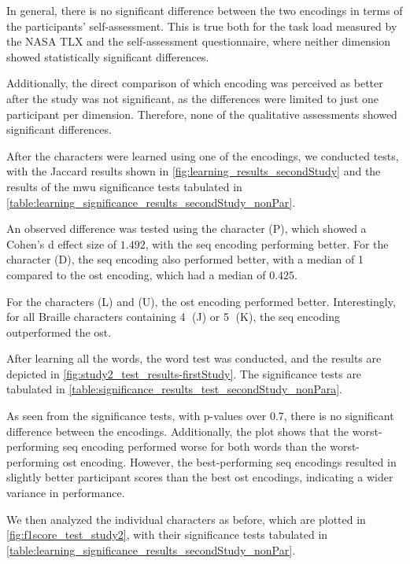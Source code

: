 In general, there is no significant difference between the two encodings in terms of the participants' self-assessment. This is true both for the task load measured by the NASA TLX and the self-assessment questionnaire, where neither dimension showed statistically significant differences.

Additionally, the direct comparison of which encoding was perceived as better after the study was not significant, as the differences were limited to just one participant per dimension. Therefore, none of the qualitative assessments showed significant differences.


After the characters were learned using one of the encodings, we conducted tests, with the Jaccard results shown in \autoref{fig:learning_results_secondStudy} and the results of the \gls{mwu} significance tests tabulated in \autoref{table:learning_significance_results_secondStudy_nonPar}.

An observed difference was tested using the character (P), which showed a Cohen's d effect size of $1.492$, with the \gls{seq} encoding performing better. For the character (D), the \gls{seq} encoding also performed better, with a median of 1 compared to the \gls{ost} encoding, which had a median of $0.425$.

For the characters (L) and (U), the \gls{ost} encoding performed better. Interestingly, for all Braille characters containing \textcircled{4} (J) or \textcircled{5} (K), the \gls{seq} encoding outperformed the \gls{ost}.


After learning all the words, the word test was conducted, and the results are depicted in \autoref{fig:study2_test_results-firstStudy}. The significance tests are tabulated in \autoref{table:significance_results_test_secondStudy_nonPara}.

As seen from the significance tests, with p-values over 0.7, there is no significant difference between the encodings. Additionally, the plot shows that the worst-performing \gls{seq} encoding performed worse for both words than the worst-performing \gls{ost} encoding. However, the best-performing \gls{seq} encodings resulted in slightly better participant scores than the best \gls{ost} encodings, indicating a wider variance in performance.

We then analyzed the individual characters as before, which are plotted in \autoref{fig:f1score_test_study2}, with their significance tests tabulated in \autoref{table:learning_significance_results_secondStudy_nonPar}.

